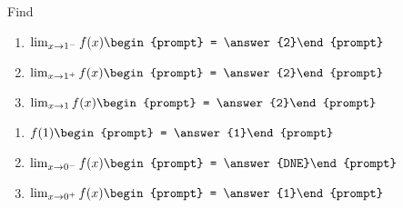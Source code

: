 \documentclass{ximera}
\begin{document}
\begin{exercise}
Find
\noindent\begin{minipage}[t]{.5\linewidth}
\begin{enumerate}
\item		$\lim_{x\to 1^-} f(x)\begin{prompt} = \answer{2}\end{prompt}$
\item		$\lim_{x\to 1^+} f(x)\begin{prompt} = \answer{2}\end{prompt}$
\item		$\lim_{x\to 1} f(x)\begin{prompt} = \answer{2}\end{prompt}$
\end{enumerate}
\end{minipage}
\noindent\begin{minipage}[t]{.5\linewidth}
\begin{enumerate}\addtocounter{enumi}{3}
\item		$f({1})\begin{prompt} = \answer{1}\end{prompt}$
\item		$\lim_{x\to 0^-} f(x)\begin{prompt} = \answer{DNE}\end{prompt}$
\item		$\lim_{x\to 0^+} f(x)\begin{prompt} = \answer{1}\end{prompt}$
\end{enumerate}
\end{minipage}

\end{exercise}
\end{document}
